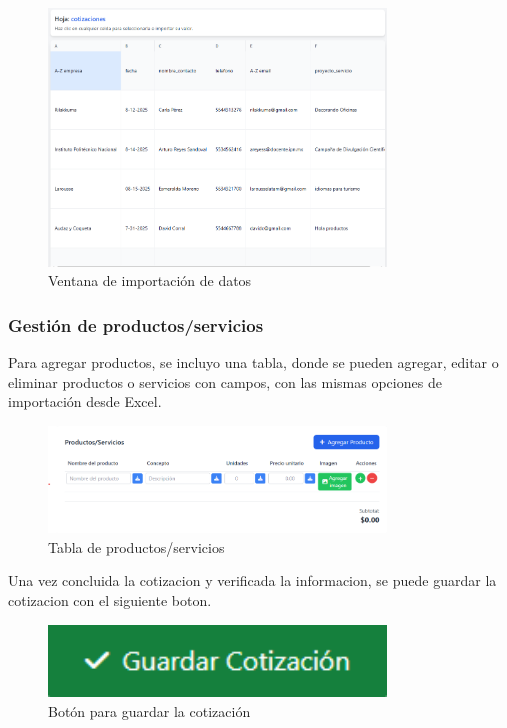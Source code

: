 \documentclass{Pretexto/bluereport}
\begin{document}
\begin{figure}[H]
    \centering
    \includegraphics[width=0.8\textwidth]{img/ventana_importacion.png}
    \caption{Ventana de importación de datos}
    \label{fig:ventana_importacion}
\end{figure}


\subsubsection{Gestión de productos/servicios}

Para agregar productos, se incluyo una tabla, donde se pueden agregar, editar o eliminar productos o servicios con campos, con las mismas opciones de importación desde Excel.

\begin{figure}[H]
    \centering
    \includegraphics[width=0.8\textwidth]{img/tabla_productos.png}
    \caption{Tabla de productos/servicios}
    \label{fig:tabla_productos} 
\end{figure}

Una vez concluida la cotizacion y verificada la informacion, se puede guardar la cotizacion con el siguiente boton.

\begin{figure}[H]
    \centering
    \includegraphics[width=0.8\textwidth]{img/boton_guardar.png}
    \caption{Botón para guardar la cotización}
    \label{fig:boton_guardar}
\end{figure}
\end{document}
